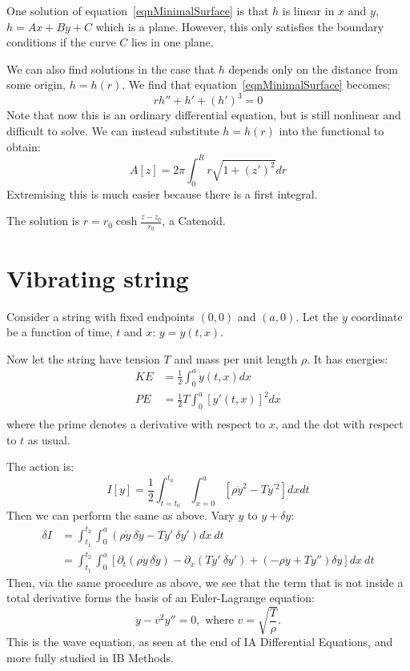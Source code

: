 \documentclass[../Main.tex]{subfiles}
\begin{document}
One solution of equation~\ref{eqnMinimalSurface} is that $h$ is linear in $x$ and $y$, $h = Ax + By + C$ which is a plane. However, this only satisfies the boundary conditions if the curve $C$ lies in one plane.

We can also find solutions in the case that $h$ depends only on the distance from some origin, $h = h(r)$.
We find that equation~\ref{eqnMinimalSurface} becomes:
\begin{equation*}
    rh'' + h' + (h')^3 = 0
\end{equation*}
Note that now this is an ordinary differential equation, but is still nonlinear and difficult to solve. We can instead substitute $h = h(r)$ into the functional to obtain:
\begin{equation*}
    A[z] = 2\pi \int_0^R r\sqrt{1 + (z')^2} dr
\end{equation*}
Extremising this is much easier because there is a first integral.

The solution is $r = r_0 \cosh{\frac{z - z_0}{r_0}}$, a Catenoid.
\section{Vibrating string}
Consider a string with fixed endpoints $(0, 0)$ and $(a, 0)$. Let the $y$ coordinate be a function of time, $t$ and $x$: $y = y(t, x)$.

Now let the string have tension $T$ and mass per unit length $\rho$. It has energies:
\begin{align*}
    KE &= \frac{1}{2} \int_0^a \dot{y}(t, x) dx \\
    PE &= \frac{1}{2} T \int_0^a [y' (t, x)]^2 dx \\
\end{align*}
where the prime denotes a derivative with respect to $x$, and the dot with respect to $t$ as usual.

The action is:
\begin{equation*}
    I[y] = \frac12 \int_{t = t_0}^{t_a} \int_{x = 0}^a \left[\rho \dot{y}^2 - T y^{\prime 2}\right] dx dt
\end{equation*}
Then we can perform the same as above. Vary $y$ to $y + \delta y$:
\begin{align*}
    \delta I &= \int_{t_1}^{t_2} \int_{0}^{a} \left(\rho \dot{y}~\delta \dot{y} - T y'~\delta y'\right)dx~dt \\
    &= \int_{t_1}^{t_2} \int_{0}^{a} \left[\partial_t \left(\rho \dot{y}~\delta \dot{y}\right) - \partial_x \left(Ty'~\delta y'\right) + \left(-\rho \ddot{y} + Ty''\right) \delta y\right] dx~dt
\end{align*}
Then, via the same procedure as above, we see that the term that is not inside a total derivative forms the basis of an Euler-Lagrange equation:
\begin{equation*}
    \ddot{y} - v^2 y'' = 0, \text{ where } v = \sqrt{\frac{T}{\rho}}.
\end{equation*}
This is the wave equation, as seen at the end of IA Differential Equations, and more fully studied in IB Methods.
\end{document}

